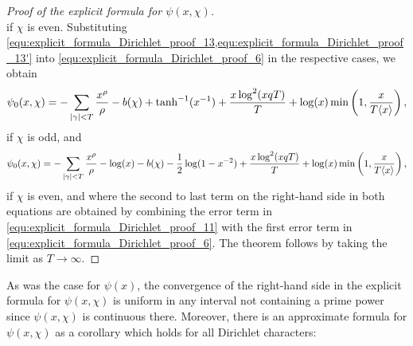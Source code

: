 \begin{proof}[Proof of the explicit formula for $\psi(x,\chi)$]
\begin{equation}
      \end{equation}
      if $\chi$ is even.
      Substituting \cref{equ:explicit_formula_Dirichlet_proof_13,equ:explicit_formula_Dirichlet_proof_13'} into \cref{equ:explicit_formula_Dirichlet_proof_6} in the respective cases, we obtain
      \begin{equation}\label{equ:explicit_formula_Dirichlet_proof_14}
        \psi_{0}(x,\chi) = -\sum_{|\gamma| < T}\frac{x^{\rho}}{\rho}-b(\chi)+\tanh^{-1}(x^{-1})+\frac{x\log^{2}(xqT)}{T}+\log(x)\min\left(1,\frac{x}{T\langle x\rangle}\right),
      \end{equation}
      if $\chi$ is odd, and
      \begin{equation}\label{equ:explicit_formula_Dirichlet_proof_14'}
        \psi_{0}(x,\chi) = -\sum_{|\gamma| < T}\frac{x^{\rho}}{\rho}-\log(x)-b(\chi)-\frac{1}{2}\log(1-x^{-2})+\frac{x\log^{2}(xqT)}{T}+\log(x)\min\left(1,\frac{x}{T\langle x\rangle}\right),
      \end{equation}
      if $\chi$ is even, and where the second to last term on the right-hand side in both equations are obtained by combining the error term in \cref{equ:explicit_formula_Dirichlet_proof_11} with the first error term in \cref{equ:explicit_formula_Dirichlet_proof_6}. The theorem follows by taking the limit as $T \to \infty$.
    \end{proof}

    As was the case for $\psi(x)$, the convergence of the right-hand side in the explicit formula for $\psi(x,\chi)$ is uniform in any interval not containing a prime power since $\psi(x,\chi)$ is continuous there. Moreover, there is an approximate formula for $\psi(x,\chi)$ as a corollary which holds for all Dirichlet characters:


